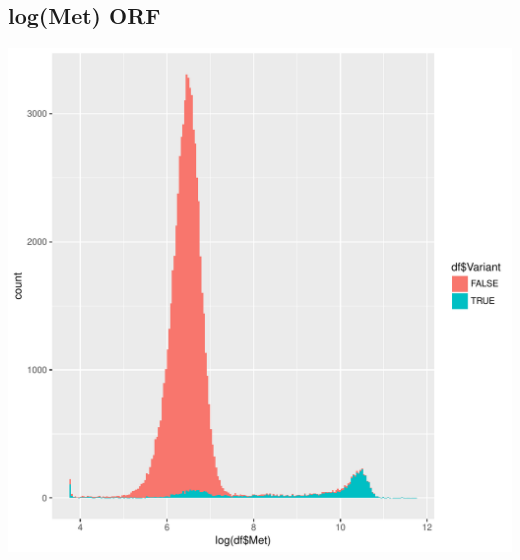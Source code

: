 \documentclass{article}\usepackage[]{graphicx}\usepackage[]{color}
\newenvironment{knitrout}{}{} %
\begin{document}
\subsection{log(Met) ORF}
\begin{knitrout}
\color{fgcolor}
\includegraphics[width=1\linewidth]{figure/dens_ORF_met-1} 

\end{knitrout}
\clearpage
\end{document}
